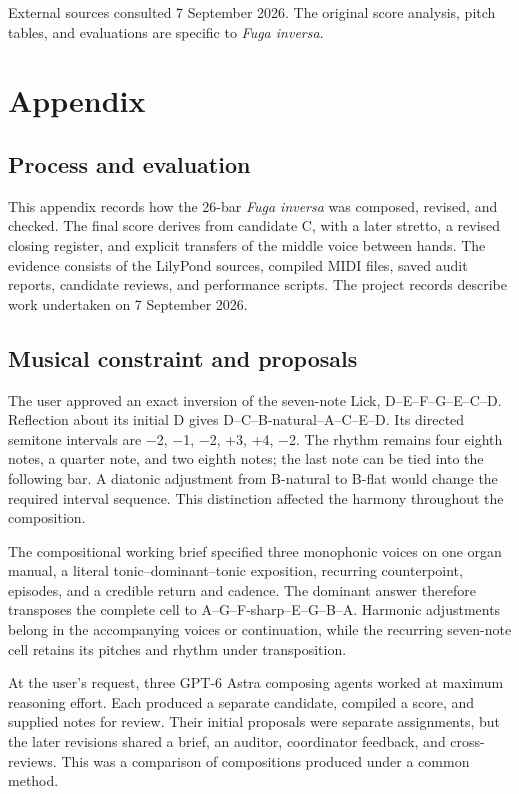 \documentclass[11pt,a4paper]{article}
\begin{document}
External sources consulted 7 September 2026. The original score analysis, pitch tables, and evaluations are specific to \emph{Fuga inversa}.

\FloatBarrier

\section{Appendix}\label{appendix}

\subsection{Process and evaluation}\label{process-and-evaluation}

This appendix records how the 26-bar \emph{Fuga inversa} was composed, revised, and checked. The final score derives from candidate C, with a later stretto, a revised closing register, and explicit transfers of the middle voice between hands. The evidence consists of the LilyPond sources, compiled MIDI files, saved audit reports, candidate reviews, and performance scripts. The project records describe work undertaken on 7 September 2026.

\subsection{Musical constraint and proposals}\label{musical-constraint-and-proposals}

The user approved an exact inversion of the seven-note Lick, D--E--F--G--E--C--D. Reflection about its initial D gives D--C--B-natural--A--C--E--D. Its directed semitone intervals are −2, −1, −2, +3, +4, −2. The rhythm remains four eighth notes, a quarter note, and two eighth notes; the last note can be tied into the following bar. A diatonic adjustment from B-natural to B-flat would change the required interval sequence. This distinction affected the harmony throughout the composition.

The compositional working brief specified three monophonic voices on one organ manual, a literal tonic--dominant--tonic exposition, recurring counterpoint, episodes, and a credible return and cadence. The dominant answer therefore transposes the complete cell to A--G--F-sharp--E--G--B--A. Harmonic adjustments belong in the accompanying voices or continuation, while the recurring seven-note cell retains its pitches and rhythm under transposition.

At the user's request, three GPT-6 Astra composing agents worked at maximum reasoning effort. Each produced a separate candidate, compiled a score, and supplied notes for review. Their initial proposals were separate assignments, but the later revisions shared a brief, an auditor, coordinator feedback, and cross-reviews. This was a comparison of compositions produced under a common method.
\end{document}
